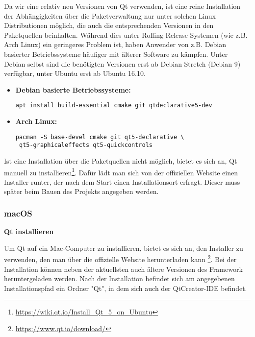 Da wir eine relativ neu Versionen von Qt verwenden, ist eine reine Installation der
Abhängigkeiten über die Paketverwaltung nur unter solchen Linux Distributionen möglich,
die auch die entsprechenden Versionen in den Paketquellen beinhalten. Während dies unter
Rolling Release Systemen (wie z.B. Arch Linux) ein geringeres Problem ist, haben Anwender von
z.B. Debian basierter Betriebssysteme häufiger mit älterer Software zu kämpfen.
Unter Debian selbst sind die benötigten Versionen erst ab Debian Stretch (Debian 9)
verfügbar, unter Ubuntu erst ab Ubuntu 16.10.

\begin{itemize}
	\item \textbf{Debian basierte Betriebssysteme:} \\
	\begin{lstlisting}
apt install build-essential cmake git qtdeclarative5-dev
	\end{lstlisting}

	\item \textbf{Arch Linux:} \\
	\begin{lstlisting}
pacman -S base-devel cmake git qt5-declarative \
 qt5-graphicaleffects qt5-quickcontrols
	\end{lstlisting}
\end{itemize}

Ist eine Installation über die Paketquellen nicht möglich, bietet es sich an, Qt manuell
zu installieren\footnote{\url{https://wiki.qt.io/Install_Qt_5_on_Ubuntu}}. Dafür lädt
man sich von der offiziellen Website einen Installer runter, der nach dem Start einen
Installationsort erfragt. Dieser muss später beim Bauen des Projekts angegeben werden.



\subsubsection{macOS}

\textbf{Qt installieren}

Um Qt auf ein Mac-Computer zu installieren, bietet es sich an, den Installer zu
verwenden, den man über die offizielle Website herunterladen kann
\footnote{\url{https://www.qt.io/download/}}. Bei der Installation können neben der
aktuellsten auch ältere Versionen des Framework heruntergeladen werden. Nach
der Installation befindet sich am angegebenen Installationspfad ein Ordner "Qt",
in dem sich auch der QtCreator-IDE befindet.

